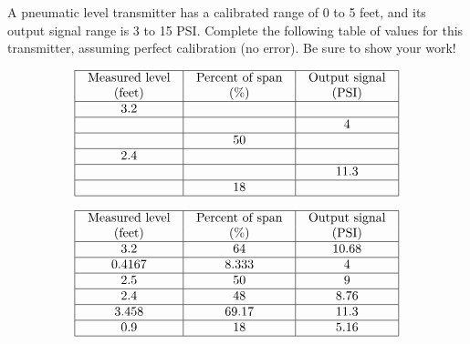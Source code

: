 

A pneumatic level transmitter has a calibrated range of 0 to 5 feet, and its output signal range is 3 to 15 PSI.  Complete the following table of values for this transmitter, assuming perfect calibration (no error).  Be sure to show your work!


$$\vbox{\offinterlineskip
\halign{\strut
\vrule \quad\hfil # \ \hfil & 
\vrule \quad\hfil # \ \hfil & 
\vrule \quad\hfil # \ \hfil \vrule \cr
\noalign{\hrule}
%
Measured level & Percent of span & Output signal \cr
%
(feet) & (\%) & (PSI) \cr
%
\noalign{\hrule}
%
3.2 &  &  \cr
%
\noalign{\hrule}
%
 &  & 4 \cr
%
\noalign{\hrule}
%
 & 50 &  \cr
%
\noalign{\hrule}
%
2.4 &  &  \cr
%
\noalign{\hrule}
%
 &  & 11.3 \cr
%
\noalign{\hrule}
%
 & 18 &  \cr
%
\noalign{\hrule}
} %
}$$ %








$$\vbox{\offinterlineskip
\halign{\strut
\vrule \quad\hfil # \ \hfil & 
\vrule \quad\hfil # \ \hfil & 
\vrule \quad\hfil # \ \hfil \vrule \cr
\noalign{\hrule}
%
Measured level & Percent of span & Output signal \cr
%
(feet) & (\%) & (PSI) \cr
%
\noalign{\hrule}
%
3.2 & 64 & 10.68 \cr
%
\noalign{\hrule}
%
0.4167 & 8.333 & 4 \cr
%
\noalign{\hrule}
%
2.5 & 50 & 9 \cr
%
\noalign{\hrule}
%
2.4 & 48 & 8.76 \cr
%
\noalign{\hrule}
%
3.458 & 69.17 & 11.3 \cr
%
\noalign{\hrule}
%
0.9 & 18 & 5.16 \cr
%
\noalign{\hrule}
} %
}$$ %












